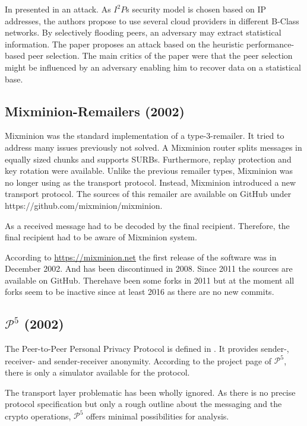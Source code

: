 In \citeyear{pets2011-i2p} \citeauthor{pets2011-i2p} presented in \cite{pets2011-i2p} an attack. As $I^2P$s security model is chosen based on IP addresses, the authors propose to use several cloud providers in different B-Class networks. By selectively flooding peers, an adversary may extract statistical information. The paper proposes an attack based on the heuristic performance-based peer selection. The main critics of the paper were that the peer selection might be influenced by an adversary enabling him to recover data on a statistical base.

\subsection{Mixminion-Remailers (2002)\label{sec:remMixminion}}
Mixminion was the standard implementation of a type-3-remailer. It tried to address many issues previously not solved. A Mixminion router splits messages in equally sized chunks and supports SURBs. Furthermore,  replay protection and key rotation were available. Unlike the previous remailer types, Mixminion was no longer using  as the transport protocol. Instead, Mixminion introduced a new transport protocol. The sources of this remailer are available on GitHub under https://github.com/mixminion/mixminion.

As a received message had to be decoded by the final recipient. Therefore, the final recipient had to be aware of Mixminion system.

According to \url{https://mixminion.net} the first release of the software was in December 2002. And has been discontinued in 2008. Since 2011 the sources are available on GitHub. Therehave been some forks in 2011 but at the moment all forks seem to be inactive since at least 2016 as there are no new commits.

\subsection{\texorpdfstring{$\mathcal{P}^5$}{P5} (2002)}
The Peer-to-Peer Personal Privacy Protocol is defined in \cite{sherwood-protocol}. It provides sender-, receiver- and sender-receiver anonymity. According to the project page of $\mathcal{P}^5$, there is only a simulator available for the protocol.

The transport layer problematic has been wholly ignored. As there is no precise protocol specification but only a rough outline about the messaging and the crypto operations, $\mathcal{P}^5$ offers minimal possibilities for analysis.

